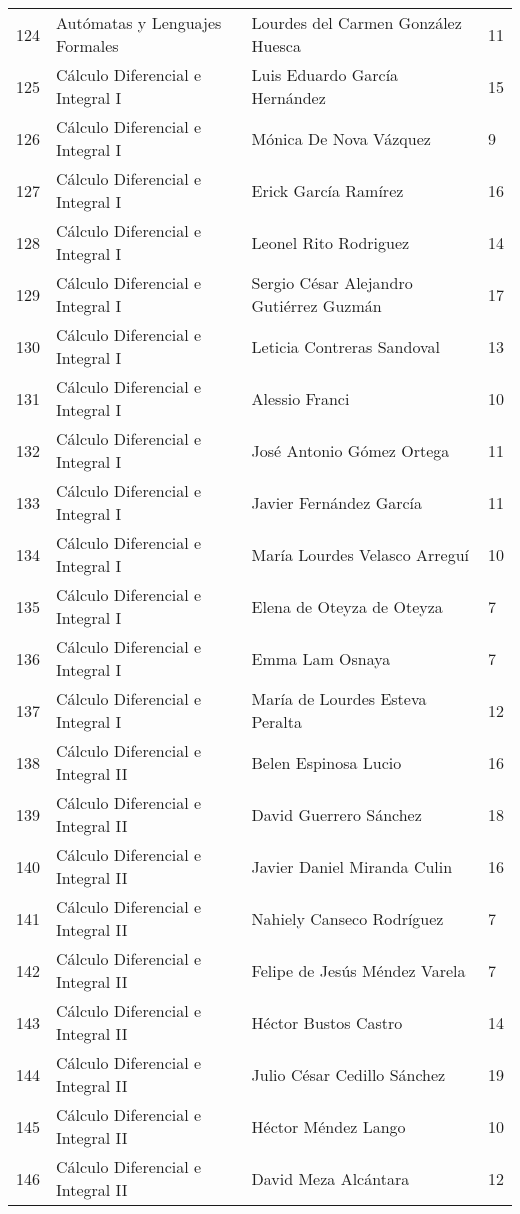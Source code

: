 \begin{table}[ht]
\begin{tabular}{rlll}
  124 & Autómatas y Lenguajes Formales & Lourdes del Carmen González Huesca & 11 \\ 
  125 & Cálculo Diferencial e Integral I & Luis Eduardo García Hernández & 15 \\ 
  126 & Cálculo Diferencial e Integral I & Mónica De Nova Vázquez & 9 \\ 
  127 & Cálculo Diferencial e Integral I & Erick García Ramírez & 16 \\ 
  128 & Cálculo Diferencial e Integral I & Leonel Rito Rodriguez & 14 \\ 
  129 & Cálculo Diferencial e Integral I & Sergio César Alejandro Gutiérrez Guzmán & 17 \\ 
  130 & Cálculo Diferencial e Integral I & Leticia Contreras Sandoval & 13 \\ 
  131 & Cálculo Diferencial e Integral I & Alessio Franci & 10 \\ 
  132 & Cálculo Diferencial e Integral I & José Antonio Gómez Ortega & 11 \\ 
  133 & Cálculo Diferencial e Integral I & Javier Fernández García & 11 \\ 
  134 & Cálculo Diferencial e Integral I & María Lourdes Velasco Arreguí & 10 \\ 
  135 & Cálculo Diferencial e Integral I & Elena de Oteyza de Oteyza & 7 \\ 
  136 & Cálculo Diferencial e Integral I & Emma Lam Osnaya & 7 \\ 
  137 & Cálculo Diferencial e Integral I & María de Lourdes Esteva Peralta & 12 \\ 
  138 & Cálculo Diferencial e Integral II & Belen Espinosa Lucio & 16 \\ 
  139 & Cálculo Diferencial e Integral II & David Guerrero Sánchez & 18 \\ 
  140 & Cálculo Diferencial e Integral II & Javier Daniel Miranda Culin & 16 \\ 
  141 & Cálculo Diferencial e Integral II & Nahiely Canseco Rodríguez & 7 \\ 
  142 & Cálculo Diferencial e Integral II & Felipe de Jesús Méndez Varela & 7 \\ 
  143 & Cálculo Diferencial e Integral II & Héctor Bustos Castro & 14 \\ 
  144 & Cálculo Diferencial e Integral II & Julio César Cedillo Sánchez & 19 \\ 
  145 & Cálculo Diferencial e Integral II & Héctor Méndez Lango & 10 \\ 
  146 & Cálculo Diferencial e Integral II & David Meza Alcántara & 12 \\ 

\end{tabular}
\end{table}
